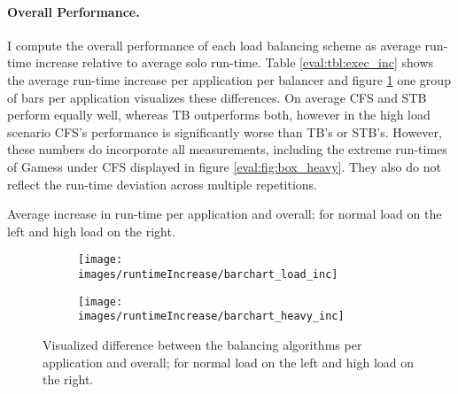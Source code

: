 \paragraph{Overall Performance.}
I compute the overall performance of each load balancing scheme as average
run-time increase relative to average solo run-time.
Table \ref{eval:tbl:exec_inc} shows the average run-time increase per
application per balancer and figure \ref{eval:fig:exec_inc} one group of
bars per application visualizes these differences.
On average CFS and STB perform equally well, whereas TB outperforms both,
however in the high load scenario CFS's performance is significantly worse
than TB's or STB's.
However, these numbers do incorporate all measurements, including the extreme
run-times of Gamess under CFS displayed in figure \ref{eval:fig:box_heavy}.
They also do not reflect the run-time deviation across multiple repetitions.
%
\begin{table}[h!]
  
  \caption{Average increase in run-time per application and overall; for
    normal load on the left and high load on the right.}
  \label{eval:tbl:exec_inc}
\end{table}
%
\begin{figure}[h!]
  \begin{subfigure}{.49\textwidth}
  \texttt{[image: images/runtimeIncrease/barchart\_load\_inc]}
  \end{subfigure}
  \begin{subfigure}{.49\textwidth}
  \texttt{[image: images/runtimeIncrease/barchart\_heavy\_inc]}
  \end{subfigure}
  \caption{Visualized difference between the balancing algorithms per
    application and overall; for normal load on the left and high load on the
    right.}
  \label{eval:fig:exec_inc}
\end{figure}
